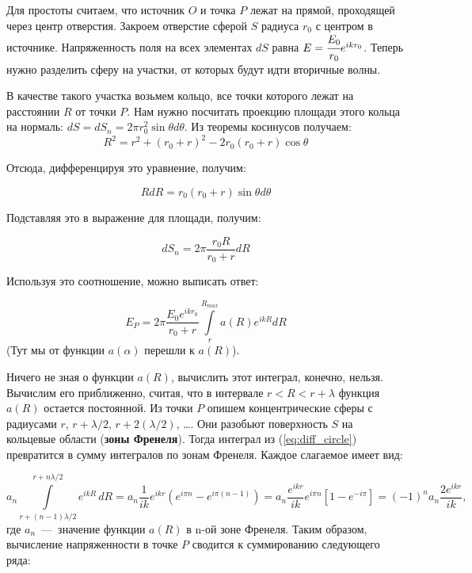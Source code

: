 \documentclass[11pt,a4paper]{article}
\numberwithin{equation}{section}
\begin{document}

Для простоты считаем, что источник $O$ и точка $P$ лежат на прямой,
проходящей через центр отверстия. Закроем отверстие сферой $S$ радиуса
$r_0$ с центром в источнике. Напряженность поля на всех элементах $dS$
равна $E = \cfrac{E_0}{r_0} e^{i k r_0}$. Теперь нужно разделить сферу
на участки, от которых будут идти вторичные волны.

В качестве такого участка возьмем кольцо, все точки которого лежат на
расстоянии $R$ от точки $P$. Нам нужно посчитать проекцию площади
этого кольца на нормаль: $dS = dS_n = 2\pi r_0^2 \sin \theta d
\theta$. Из теоремы косинусов получаем:
\begin{equation}
R^2 = r^2 + (r_0 +r)^2 - 2r_0 (r_0 + r) \cos \theta
\end{equation}

Отсюда, дифференцируя это уравнение, получим:

\begin{equation}
R dR = r_0 (r_0 + r) \sin \theta d \theta
\end{equation}

Подставляя это в выражение для площади, получим: 

\begin{equation}
dS_n = 2 \pi \dfrac{r_0 R}{r_0 + r} dR
\end{equation}

Используя это соотношение, можно выписать ответ:

\begin{equation} \label{eq:diff_circle}
E_P = 2 \pi \frac{E_0 e^{i k r_0}}{r_0 + r} \int\limits_{r}^{R_{max}} a(R) e^{i k R} dR
\end{equation}
(Тут мы от функции $a(\alpha)$ перешли к $a(R)$).

Ничего не зная о функции $a(R)$, вычислить этот интеграл, конечно,
нельзя. Вычислим его приближенно, считая, что в интервале $r< R < r +
\lambda$ функция $a(R)$ остается постоянной. Из точки $P$ опишем
концентрические сферы с радиусами $r$, $r + \lambda /2$, $r + 2
(\lambda /2)$, \ldots. Они разобьют поверхность $S$ на кольцевые
области (\textbf{зоны Френеля}). Тогда интеграл из
(\ref{eq:diff_circle}) превратится в сумму интегралов по зонам
Френеля. Каждое слагаемое имеет вид:

\begin{equation}
a_n \int\limits_{r + (n-1) \lambda /2}^{r + n \lambda /2} e^{i k R}\, dR = a_n \frac{1}{ik} e^{ikr} \left(e^{i \pi n} - e^{i \pi (n-1)} \right) = a_n \frac{e^{ikr}}{ik} e^{i \pi n} \left[1 - e^{-i \pi} \right] = (-1)^n a_n \frac{2e^{ikr}}{ik},
\end{equation}
где $a_n$~---~значение функции $a(R)$ в n-ой зоне Френеля. Таким
образом, вычисление напряженности в точке $P$ сводится к суммированию
следующего ряда:
\end{document}

